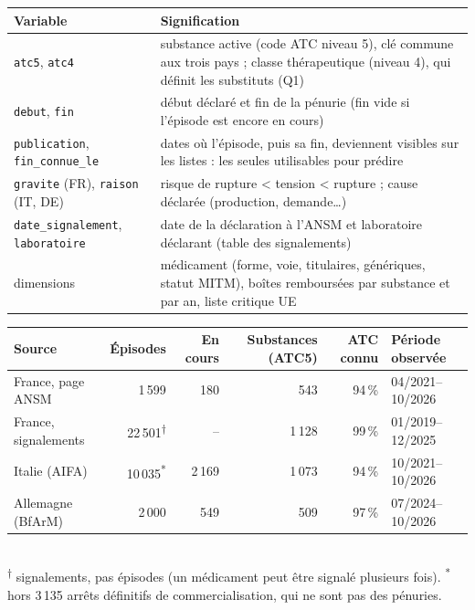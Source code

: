 \documentclass[10pt,a4paper]{article}
\begin{document}
\begin{center}\footnotesize
\begin{tabularx}{\linewidth}{@{}l X@{}}
\toprule
Variable & Signification \\
\midrule
\texttt{atc5}, \texttt{atc4} & substance active (code ATC niveau 5), clé commune aux trois pays ; classe thérapeutique (niveau 4), qui définit les substituts (Q1) \\
\texttt{debut}, \texttt{fin} & début déclaré et fin de la pénurie (fin vide si l'épisode est encore en cours) \\
\texttt{publication}, \texttt{fin\_connue\_le} & dates où l'épisode, puis sa fin, deviennent visibles sur les listes : les seules utilisables pour prédire \\
\texttt{gravite} (FR), \texttt{raison} (IT, DE) & risque de rupture < tension < rupture ; cause déclarée (production, demande…) \\
\texttt{date\_signalement}, \texttt{laboratoire} & date de la déclaration à l'ANSM et laboratoire déclarant (table des signalements) \\
dimensions & médicament (forme, voie, titulaires, génériques, statut MITM), boîtes remboursées par substance et par an, liste critique UE \\
\bottomrule
\end{tabularx}
\end{center}

\begin{center}\small
\begin{tabular}{@{}l r r r r l@{}}
\toprule
Source & Épisodes & En cours & Substances (ATC5) & ATC connu & Période observée \\
\midrule
France, page ANSM & 1\,599 & 180 & 543 & 94\,\% & 04/2021--10/2026 \\
France, signalements & 22\,501\textsuperscript{†} & -- & 1\,128 & 99\,\% & 01/2019--12/2025 \\
Italie (AIFA) & 10\,035\textsuperscript{*} & 2\,169 & 1\,073 & 94\,\% & 10/2021--10/2026 \\
Allemagne (BfArM) & 2\,000 & 549 & 509 & 97\,\% & 07/2024--10/2026 \\
\bottomrule
\end{tabular}\\[1pt]
{\footnotesize \textsuperscript{†} signalements, pas épisodes (un médicament peut être signalé plusieurs fois).
\textsuperscript{*} hors 3\,135 arrêts définitifs de commercialisation, qui ne sont pas des pénuries.}
\end{center}
\end{document}
